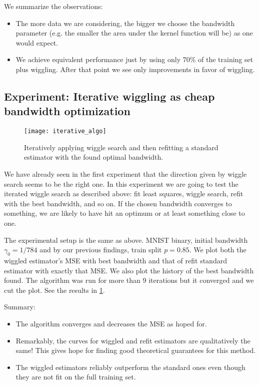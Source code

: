\documentclass[12pt]{amsart}
\begin{document}
We summarize the observations:
\begin{itemize}
    \item The more data we are considering, the bigger we choose the 
        bandwidth parameter (e.g. the smaller the area under the kernel
        function will be) as one would expect.
    \item We achieve equivalent performance just by using only 70\% of the
        training set plus wiggling.
        After that point we see only improvements in favor of wiggling.
\end{itemize}

\subsection{Experiment: Iterative wiggling as cheap bandwidth optimization}

\begin{figure}[htp]
    \centering
    \texttt{[image: iterative\_algo]}
    \caption{Iteratively applying wiggle search and then refitting
        a standard estimator with the found optimal bandwidth.}
    \label{fig:iterative_algo}
\end{figure}

We have already seen in the first experiment that the direction given by
wiggle search seems to be the right one.
In this experiment we are going to test the iterated wiggle search as 
described above: fit least squares, wiggle search, refit with the best bandwidth, 
and so on.
If the chosen bandwidth converges to something, we are likely to have hit an 
optimum or at least something close to one.

The experimental setup is the same as above.
MNIST binary, initial bandwidth $\gamma_0 = 1/784$ and by our previous 
findings, train split $p = 0.85$.
We plot both the wiggled estimator's MSE with best bandwidth and that 
of refit standard estimator with exactly that MSE.
We also plot the history of the best bandwidth found.
The algorithm was run for more than 9 iterations but it converged 
and we cut the plot.
See the results in \cref{fig:iterative_algo}.

Summary:
\begin{itemize}
    \item The algorithm converges and decreases the MSE as hoped for.
    \item Remarkably, the curves for wiggled and refit estimators are
        qualitatively the same! 
        This gives hope for finding good theoretical guarantees for this
        method.
    \item The wiggled estimators reliably outperform the standard ones
        even though they are not fit on the full training set.
\end{itemize}
\end{document}
